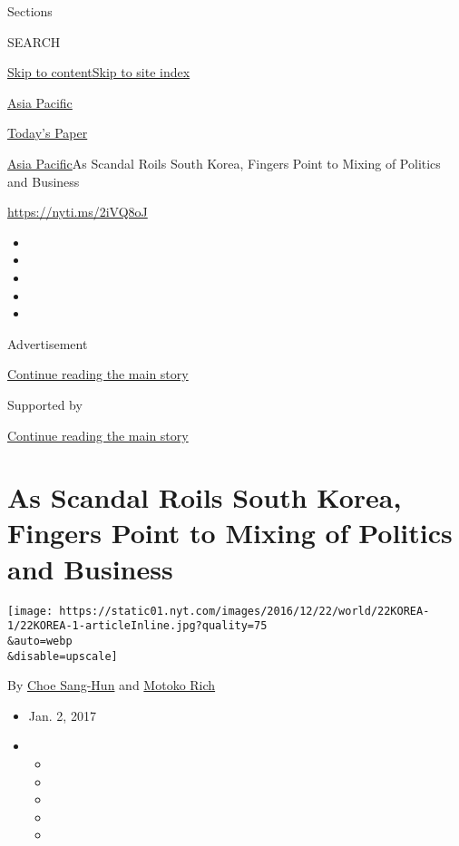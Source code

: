 Sections

SEARCH

\protect\hyperlink{site-content}{Skip to
content}\protect\hyperlink{site-index}{Skip to site index}

\href{https://www.nytimes.com/section/world/asia}{Asia Pacific}

\href{https://myaccount.nytimes.com/auth/login?response_type=cookie\&client_id=vi}{}

\href{https://www.nytimes.com/section/todayspaper}{Today's Paper}

\href{/section/world/asia}{Asia Pacific}\textbar{}As Scandal Roils South
Korea, Fingers Point to Mixing of Politics and Business

\url{https://nyti.ms/2iVQ8oJ}

\begin{itemize}
\item
\item
\item
\item
\item
\end{itemize}

Advertisement

\protect\hyperlink{after-top}{Continue reading the main story}

Supported by

\protect\hyperlink{after-sponsor}{Continue reading the main story}

\hypertarget{as-scandal-roils-south-korea-fingers-point-to-mixing-of-politics-and-business}{%
\section{As Scandal Roils South Korea, Fingers Point to Mixing of
Politics and
Business}\label{as-scandal-roils-south-korea-fingers-point-to-mixing-of-politics-and-business}}

\texttt{[image: https://static01.nyt.com/images/2016/12/22/world/22KOREA-1/22KOREA-1-articleInline.jpg?quality=75\\\&auto=webp\\\&disable=upscale]}

By \href{http://www.nytimes.com/by/choe-sang-hun}{Choe Sang-Hun} and
\href{http://www.nytimes.com/by/motoko-rich}{Motoko Rich}

\begin{itemize}
\item
  Jan. 2, 2017
\item
  \begin{itemize}
  \item
  \item
  \item
  \item
  \item
  \end{itemize}
\end{itemize}

